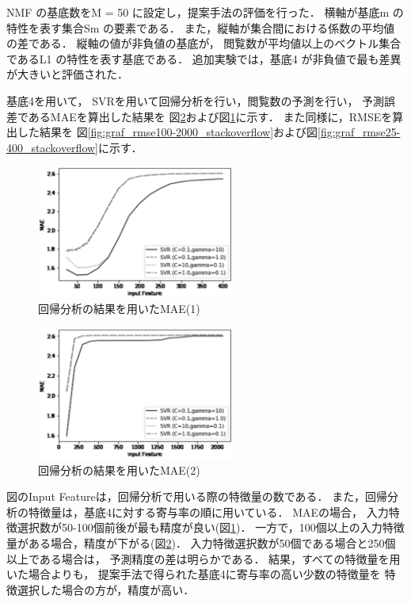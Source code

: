 \documentclass[12pt,a4paper,twocolumn,twoside]{jsik}
\begin{document}
NMF の基底数をM = 50 に設定し，提案手法の評価を行った．
横軸が基底m の特性を表す集合Sm の要素である．
また，縦軸が集合間における係数の平均値の差である．
縦軸の値が非負値の基底が，
閲覧数が平均値以上のベクトル集合であるL1 の特性を表す基底である．
追加実験では，基底4 が非負値で最も差異が大きいと評価された．

基底4を用いて，
SVRを用いて回帰分析を行い，閲覧数の予測を行い，
予測誤差であるMAEを算出した結果を
図\ref{fig:graf_mae100-2000_stackoverflow}および図\ref{fig:graf_mae25-400_stackoverflow}に示す．
%
また同様に，RMSEを算出した結果を
図\ref{fig:graf_rmse100-2000_stackoverflow}および図\ref{fig:graf_rmse25-400_stackoverflow}に示す．

\begin{figure}[htb]
  \begin{center}
    \includegraphics[width=6.5cm]{./eps/Regression-MAE-RBF_25-400.eps}
    \caption{回帰分析の結果を用いたMAE(1)}
    \label{fig:graf_mae25-400_stackoverflow}
  \end{center}
\end{figure}

\newpage
\begin{figure}[htb]
  \begin{center}
    \includegraphics[width=6.5cm]{./eps/Regression-MAE-RBF_2071.eps}
    \caption{回帰分析の結果を用いたMAE(2)}
    \label{fig:graf_mae100-2000_stackoverflow}
  \end{center}
\end{figure}
%
図のInput Featureは，回帰分析で用いる際の特徴量の数である．
また，回帰分析の特徴量は，基底4に対する寄与率の順に用いている．
%
MAEの場合，
入力特徴選択数が50-100個前後が最も精度が良い(図\ref{fig:graf_mae25-400_stackoverflow})．
一方で，100個以上の入力特徴量がある場合，精度が下がる(図\ref{fig:graf_mae100-2000_stackoverflow})．
%
入力特徴選択数が50個である場合と250個以上である場合は，
予測精度の差は明らかである．
%
結果，すべての特徴量を用いた場合よりも，
提案手法で得られた基底4に寄与率の高い少数の特徴量を
特徴選択した場合の方が，精度が高い．
\end{document}
